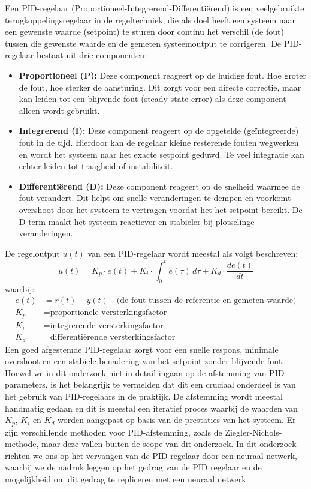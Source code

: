 Een PID-regelaar (Proportioneel-Integrerend-Differentiërend)\cite{WikipediaPID2024}\cite{Franklin1995_PID} is een veelgebruikte terugkoppelingsregelaar in de regeltechniek, die als doel heeft een systeem naar een gewenste waarde (setpoint) te sturen door continu het verschil (de fout) tussen die gewenste waarde en de gemeten systeemoutput te corrigeren.
De PID-regelaar bestaat uit drie componenten:
\begin{itemize}
  \item \textbf{Proportioneel (P):} Deze component reageert op de huidige fout. Hoe groter de fout, hoe sterker de aansturing. Dit zorgt voor een directe correctie, maar kan leiden tot een blijvende fout (steady-state error) als deze component alleen wordt gebruikt.
  \item \textbf{Integrerend (I):} Deze component reageert op de opgetelde (geïntegreerde) fout in de tijd. Hierdoor kan de regelaar kleine resterende fouten wegwerken en wordt het systeem naar het exacte setpoint geduwd. Te veel integratie kan echter leiden tot traagheid of instabiliteit.
  \item \textbf{Differentiërend (D):} Deze component reageert op de snelheid waarmee de fout verandert. Dit helpt om snelle veranderingen te dempen en voorkomt overshoot door het systeem te vertragen voordat het het setpoint bereikt. De D-term maakt het systeem reactiever en stabieler bij plotselinge veranderingen.
\end{itemize}
De regeloutput \( u(t) \) van een PID-regelaar wordt meestal als volgt beschreven:
\begin{equation}
u(t) = K_p \cdot e(t) + K_i \cdot \int_0^t e(\tau)\,d\tau + K_d \cdot \frac{de(t)}{dt}
\label{eq:pid}
\end{equation}
waarbij:
\[
\begin{aligned}
e(t) &= r(t) - y(t) \quad \text{(de fout tussen de referentie en gemeten waarde)} \\
K_p  &= \text{proportionele versterkingsfactor} \\
K_i  &= \text{integrerende versterkingsfactor} \\
K_d  &= \text{differentiërende versterkingsfactor}
\end{aligned}
\]
Een goed afgestemde PID-regelaar zorgt voor een snelle respons, minimale overshoot en een stabiele benadering van het setpoint zonder blijvende fout. Hoewel we in dit onderzoek niet in detail ingaan op de afstemming van PID-parameters, is het belangrijk te vermelden dat dit een cruciaal onderdeel is van het gebruik van PID-regelaars in de praktijk. De afstemming wordt meestal handmatig gedaan en dit is meestal een iteratief proces waarbij de waarden van \(K_p\), \(K_i\) en \(K_d\) worden aangepast op basis van de prestaties van het systeem. Er zijn verschillende methoden voor PID-afstemming, zoals de Ziegler-Nichols-methode, maar deze vallen buiten de scope van dit onderzoek. In dit onderzoek richten we ons op het vervangen van de PID-regelaar door een neuraal netwerk, waarbij we de nadruk leggen op het gedrag van de PID regelaar en de mogelijkheid om dit gedrag te repliceren met een neuraal netwerk.
